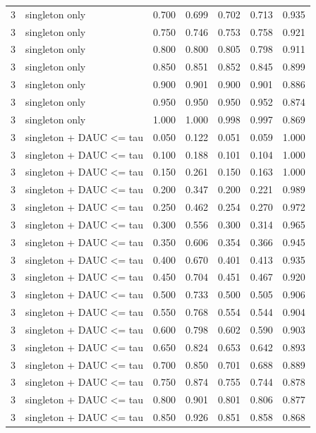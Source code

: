 \begin{tabular}{rlrrrrr}
3 & singleton only & 0.700 & 0.699 & 0.702 & 0.713 & 0.935 \\
3 & singleton only & 0.750 & 0.746 & 0.753 & 0.758 & 0.921 \\
3 & singleton only & 0.800 & 0.800 & 0.805 & 0.798 & 0.911 \\
3 & singleton only & 0.850 & 0.851 & 0.852 & 0.845 & 0.899 \\
3 & singleton only & 0.900 & 0.901 & 0.900 & 0.901 & 0.886 \\
3 & singleton only & 0.950 & 0.950 & 0.950 & 0.952 & 0.874 \\
3 & singleton only & 1.000 & 1.000 & 0.998 & 0.997 & 0.869 \\
3 & singleton + DAUC <= tau & 0.050 & 0.122 & 0.051 & 0.059 & 1.000 \\
3 & singleton + DAUC <= tau & 0.100 & 0.188 & 0.101 & 0.104 & 1.000 \\
3 & singleton + DAUC <= tau & 0.150 & 0.261 & 0.150 & 0.163 & 1.000 \\
3 & singleton + DAUC <= tau & 0.200 & 0.347 & 0.200 & 0.221 & 0.989 \\
3 & singleton + DAUC <= tau & 0.250 & 0.462 & 0.254 & 0.270 & 0.972 \\
3 & singleton + DAUC <= tau & 0.300 & 0.556 & 0.300 & 0.314 & 0.965 \\
3 & singleton + DAUC <= tau & 0.350 & 0.606 & 0.354 & 0.366 & 0.945 \\
3 & singleton + DAUC <= tau & 0.400 & 0.670 & 0.401 & 0.413 & 0.935 \\
3 & singleton + DAUC <= tau & 0.450 & 0.704 & 0.451 & 0.467 & 0.920 \\
3 & singleton + DAUC <= tau & 0.500 & 0.733 & 0.500 & 0.505 & 0.906 \\
3 & singleton + DAUC <= tau & 0.550 & 0.768 & 0.554 & 0.544 & 0.904 \\
3 & singleton + DAUC <= tau & 0.600 & 0.798 & 0.602 & 0.590 & 0.903 \\
3 & singleton + DAUC <= tau & 0.650 & 0.824 & 0.653 & 0.642 & 0.893 \\
3 & singleton + DAUC <= tau & 0.700 & 0.850 & 0.701 & 0.688 & 0.889 \\
3 & singleton + DAUC <= tau & 0.750 & 0.874 & 0.755 & 0.744 & 0.878 \\
3 & singleton + DAUC <= tau & 0.800 & 0.901 & 0.801 & 0.806 & 0.877 \\
3 & singleton + DAUC <= tau & 0.850 & 0.926 & 0.851 & 0.858 & 0.868 \\

\end{tabular}
